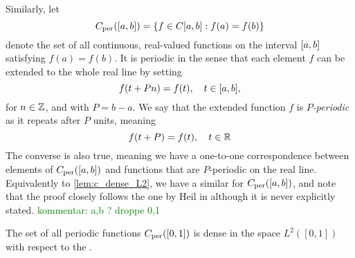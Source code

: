 \documentclass[../thesis.tex]{subfiles}
\begin{document}
Similarly, let 
\begin{equation}
    C_{\text{per}}([a,b])= \left\{f \in C[a,b]: f(a)=f(b)\right\}
\end{equation}
denote the set of all continuous, real-valued functions on the interval $[a,b]$ satisfying $f(a)=f(b)$. It is periodic in the sense that each element $f$ can be extended to the whole real line by setting 
\begin{equation}
    f(t+Pn) = f(t), \quad t\in [a,b],
\end{equation}
for $n\in \mathbb{Z}$, and with $P=b-a$. We say that the extended function $f$ is $P$\emph{-periodic} as it repeats after $P$ units, meaning
\begin{equation}
    f(t+P) = f(t), \quad t\in \mathbb{R}
\end{equation}
The converse is also true, meaning we have a one-to-one correspondence between elements of $C_{\text{per}}([a,b])$ and functions that are $P$-periodic on the real line. %
Equivalently to \cref{lem:c_dense_L2}, we have a similar  for $C_{\text{per}}([a,b])$, and note that the proof closely follows the one by Heil in \cite[p.~228]{heilMetricsNormsInner2018} although it is never explicitly stated.
\textcolor{green}{kommentar: a,b ? droppe 0,1} %
\begin{lemma}\label{lem:c_per_dense_c_and_dense_L2}
    The set of all periodic functions $C_{\text{per}}([0,1])$ is dense in the space $L^2([0,1])$ with respect to the \Ltwonorm.
\end{lemma}
\end{document}
